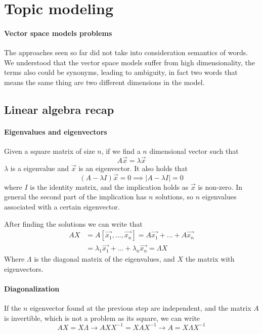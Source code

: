 \section{Topic modeling}

\paragraph{Vector space models problems}
The approaches seen so far did not take into 
consideration semantics of words. 
We understood that the vector space models suffer 
from high dimensionality, the terms also could be synonyms, 
leading to ambiguity, in fact two words that means 
the same thing are two different dimensions in the model.
\subsection{Linear algebra recap}

\paragraph{Eigenvalues and eigenvectors}
Given a square matrix of size $n$, if we find a
 $n$ dimensional vector such that
$$A\vec{x} = \lambda\vec{x}$$
$\lambda$ is a eigenvalue and $\vec{x}$ is an eigenvector.
It also holds that 
$$(A - \lambda I )\vec{x} = 0 \implies |A - \lambda I| = 0$$
where $I$ is the identity matrix, and the implication holds as $\vec{x}$ is non-zero.
In general the second part of the implication has $n$ solutions, so 
$n$ eigenvalues associated with a certain eigenvector.

After finding the solutions we can write that 
\begin{equation}
    \begin{aligned}
        AX &= A[\vec{x_1}, \dots, \vec{x_n}] = A\vec{x_1} + \dots + A\vec{x_n}\\
        & = \lambda_1\vec{x_1} + \dots + \lambda_n\vec{x_n} = \varLambda X  
    \end{aligned}
\end{equation}
Where $\varLambda$ is the diagonal matrix of the eigenvalues, and $X$ the matrix 
with eigenvectors. 

\paragraph{Diagonalization}
If the $n$ eigenvector found at the previous step are independent, 
and the matrix $A$ is invertible, which is not a problem as its square, 
we can write 
$$AX = X\varLambda \rightarrow AXX^{-1} = XAX^{-1} \rightarrow A = X\varLambda X^{-1}$$

